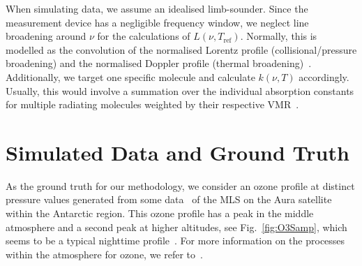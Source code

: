 When simulating data, we assume an idealised limb-sounder.
Since the measurement device has a negligible frequency window, we neglect line broadening around $\nu$ for the calculations of $L(\nu, T_{\text{ref}})$.
Normally, this is modelled as the convolution of the normalised Lorentz profile (collisional/pressure broadening) and the normalised Doppler profile (thermal broadening)~\cite{mipas2000handbook}.
Additionally, we target one specific molecule and calculate $k(\nu, T)$ accordingly.
Usually, this would involve a summation over the individual absorption constants for multiple radiating molecules weighted by their respective VMR~\cite{mipas2000handbook}.


\section{Simulated Data and Ground Truth}
\label{sec:SimDat}
As the ground truth for our methodology, we consider an ozone profile at distinct pressure values generated from some data~\cite{MLSdata} of the MLS on the Aura satellite within the Antarctic region.
This ozone profile has a peak in the middle atmosphere and a second peak at higher altitudes, see Fig.~\ref{fig:O3Samp}, which seems to be a typical nighttime profile~\cite{Lee2020NightOzone}.
For more information on the processes within the atmosphere for ozone, we refer to~\cite{Lee2020NightOzone}.

